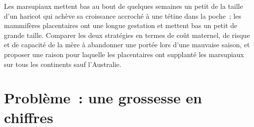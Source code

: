\begin{exercise}[$\star\star\star$]\label{exo:b2:mammal-reproduction:12}
Les marsupiaux mettent bas au bout de quelques semaines un petit de la
taille d'un haricot qui achève sa croissance accroché à une tétine dans
la poche~; les mammifères placentaires ont une longue gestation et
mettent bas un petit de grande taille. Comparer les deux stratégies en
termes de coût maternel, de risque et de capacité de la mère à
abandonner une portée lors d'une mauvaise saison, et proposer une
raison pour laquelle les placentaires ont supplanté les marsupiaux sur
tous les continents sauf l'Australie.
\end{exercise}

\section{Problème~: une grossesse en chiffres}

